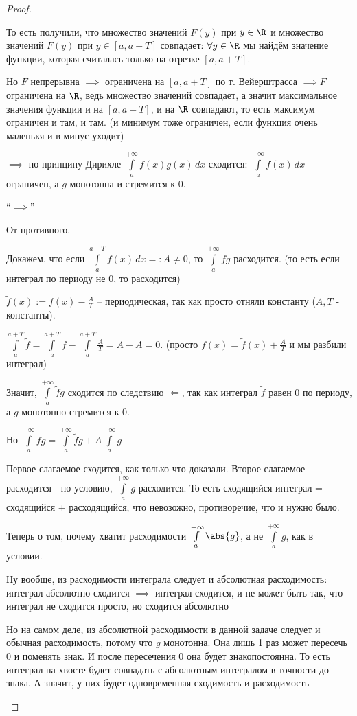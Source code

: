 \begin{proof}
\begin{enumerate}
    То есть получили, что множество значений $F(y)$ при $y \in \R$ и множество значений $F(y)$ при $y \in [a,a+T]$ совпадает: $\forall y \in \R$ мы найдём значение функции, которая считалась только на отрезке $[a,a+T]$.
	
    Но $F$ непрерывна $\implies$ ограничена на $[a,a+T]$ по т. Вейерштрасса $\implies F$ ограничена на $\R$, ведь множество значений совпадает, а значит максимальное значения функции и на $[a, a+T]$, и на $\R$ совпадают, то есть максимум ограничен и там, и там. (и минимум тоже ограничен, если функция очень маленькя и в минус уходит)
	
    $\implies$ по принципу Дирихле $\int\limits_a^{+\infty}f(x)g(x)\, dx$ сходится: $\int\limits_a^{+\infty} f(x)\, dx$ ограничен, а $g$ монотонна и стремится к $0$.
	
	``$\implies$''
	
    От противного.

    Докажем, что если $\int\limits_a^{a+T} f(x)\, dx =:A\ne 0$, то $\int\limits_a^{+\infty} fg$ расходится. (то есть если интеграл по периоду не 0, то расходится)
	
    $\tilde{f}(x):= f(x) - \frac{A}{T}$ -- периодическая, так как просто отняли константу ($A,T$ - константы).
	
    $\int\limits_a^{a+T} \tilde{f} = \int\limits_a^{a+T} f - \int\limits_a^{a+T} \frac{A}{T} = A - A = 0$. (просто $f(x) = \tilde{f}(x) + \frac{A}{T}$ и мы разбили интеграл) 
	
    Значит, $\int\limits_a^{+\infty} \tilde{f}g$ сходится по следствию $\Longleftarrow$, так как интеграл $\tilde{f}$ равен 0 по периоду, а $g$ монотонно стремится к 0. 
	
	Но $\int\limits_a^{+\infty} fg = \int\limits_a^{+\infty} \tilde{f}g + A\int\limits_a^{+\infty}g$

    Первое слагаемое сходится, как только что доказали. Второе слагаемое расходится - по условию, $\int\limits_a^{+\infty} g$ расходится. То есть сходящийся интеграл = сходящийся + расходящийся, что невозожно, противоречие, что и нужно было.

    Теперь о том, почему хватит расходимости $\int\limits_a^{+\infty} \abs{g}$, а не  $\int\limits_a^{+\infty} g$, как в условии.

    Ну вообще, из расходимости интеграла следует и абсолютная расходимость: интеграл абсолютно сходится $\implies$ интеграл сходится, и не может быть так, что интеграл не сходится просто, но сходится абсолютно

    Но на самом деле, из абсолютной расходимости в данной задаче следует и обычная расходимость, потому что $g$ монотонна. Она лишь 1 раз может пересечь 0 и поменять знак. И после пересечения 0 она будет знакопостоянна. То есть интеграл на хвосте будет совпадать с абсолютным интегралом в точности до знака. А значит, у них будет одновременная сходимость и расходимость


\end{enumerate}
\end{proof}
